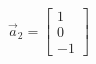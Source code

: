 \documentclass[preview]{standalone}
\begin{document}
\begin{align*}
\vec{a}_2=\begin{bmatrix} 1 \\ 0 \\ -1 \end{bmatrix}
\end{align*}
\end{document}
